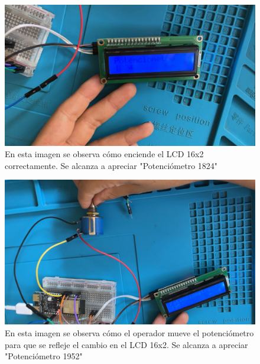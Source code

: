 \begin{enumerate}
\begin{figure}[H]
        \includegraphics[trim = {1mm 1mm 1mm 1mm},clip,scale=0.4]{3/Img/evidencia3.png}
        \caption{En esta imagen se observa cómo enciende el LCD 16x2 correctamente. Se alcanza a apreciar "Potenciómetro 1824"} 
        \label{fig:evidencia3}
    \end{figure}
    \begin{figure}[H]
        \centering
        \includegraphics[trim = {1mm 1mm 1mm 1mm},clip,scale=0.4]{3/Img/evidencia4.png}
        \caption{En esta imagen se observa cómo el operador mueve el potenciómetro para que se refleje el cambio en el LCD 16x2. Se alcanza a apreciar "Potenciómetro 1952"} 
        \label{fig:evidencia4}
    \end{figure}
    \end{enumerate}
    
